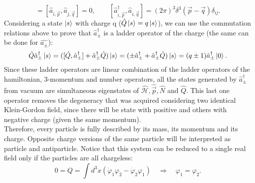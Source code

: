 \begin{equation*}
    [\hat{a}^\dagger_{i,\vec p},\hat{a}^\dagger_{j,\vec q}]=[\hat{a}_{i,\vec p},\hat{a}_{j,\vec q}]=0,\qquad[\hat{a}^\dagger_{i,\vec p},\hat{a}_{i,\vec q}]=(2\pi)^3\delta^3(\vec p-\vec q)\delta_{ij}.
\end{equation*}
Considering a state $\ket{s}$ with charge q ($\hat Q\ket s=q\ket s$), we can use the commutation relations above to prove that $\hat{a}_{\pm}^\dagger$ is a ladder operator of the charge (the same can be done for $\hat{a_{\pm}}$):
\begin{equation*}
    \hat{Q}\hat{a}^\dagger_{\pm} \ket{s}=([\hat{Q},\hat{a}^\dagger_{\pm}]+\hat{a}^\dagger_{\pm}\hat{Q})\ket{s}=(\pm\hat{a}^\dagger_{\pm}+\hat{a}^\dagger_{\pm}\hat{Q})\ket{s}=(q\pm1)\hat{a}^\dagger_{\pm}\ket{0}.
\end{equation*}
Since these ladder operators are linear combination of the ladder operators of the hamiltonian, 3-momentum and number operators, all the states generated by $\hat{a}^\dagger_{\pm}$ from vacuum are simultaneous eigenstates of $\hat{\mathcal{H}},\hat{\vec{p}},\hat{ N}$ and $\hat{ Q}$. This last one operator removes the degeneracy that was acquired considering two identical Klein-Gordon field, since there will be state with positive and others with negative charge (given the same momentum). \\
Therefore, every particle is fully described by its mass, its momentum and its charge. Opposite charge versions of the same particle will be interpreted as particle and antiparticle. Notice that this system can be reduced to a single real field only if the particles are all chargeless:
\begin{equation*}
    0=Q=\int d^3x(\dot\varphi_1\varphi_2-\dot\varphi_2\varphi_1)\quad \Rightarrow\quad \varphi_1=\varphi_2.
\end{equation*}

